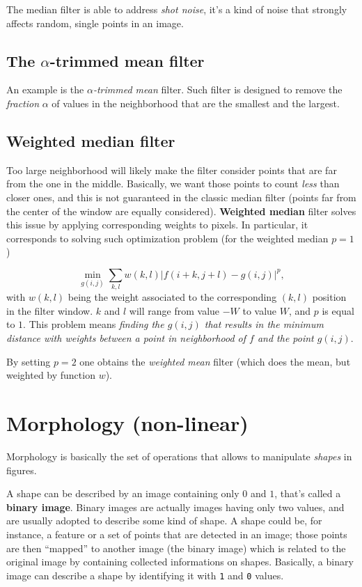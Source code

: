 \documentclass[10pt]{report}
\begin{document}
The median filter is able to address \emph{shot noise}, it's a kind of noise
that strongly affects random, single points in an image.

\subsection{The \(\alpha\)-trimmed mean filter}
\label{the-alpha-trimmed-mean-filter}
An example is the \emph{\(\alpha\)-trimmed mean} filter. Such filter is
designed to remove the \emph{fraction} \(\alpha\) of values in the
neighborhood that are the smallest and the largest.

\subsection{Weighted median filter}
\label{weighted-median-filter}
Too large neighborhood will likely make the filter consider points that
are far from the one in the middle. Basically, we want those points to
count \emph{less} than closer ones, and this is not guaranteed in the classic
median filter (points far from the center of the window are equally
considered). \textbf{Weighted median} filter solves this issue by applying
corresponding weights to pixels. In particular, it corresponds to
solving such optimization problem (for the weighted median \(p = 1\))

\[ \min_{g(i, j)} \sum_{k, l} w(k, l)|f(i + k, j + l) - g(i, j)|^p,\]
with \(w(k, l)\) being the weight associated to the corresponding
\((k, l)\) position in the filter window. \(k\) and \(l\) will range
from value \(-W\) to value \(W\), and \(p\) is equal to \(1\). This
problem means \emph{finding the \(g(i, j)\) that results in the minimum
distance with weights between a point in neighborhood of \(f\) and the
point \(g(i, j)\)}.

By setting \(p=2\) one obtains the \emph{weighted mean} filter (which does
the mean, but weighted by function \(w\)).

\section{Morphology (non-linear)}
\label{morphology-non-linear}
Morphology is basically the set of operations that allows to manipulate
\emph{shapes} in figures.

A shape can be described by an image containing only \(0\) and \(1\),
that's called a \textbf{binary image}. Binary images are actually images having
only two values, and are usually adopted to describe some kind of shape.
A shape could be, for instance, a feature or a set of points that are
detected in an image; those points are then ``mapped'' to another image
(the binary image) which is related to the original image by containing
collected informations on shapes. Basically, a binary image can describe
a shape by identifying it with \texttt{1} and \texttt{0} values.
\end{document}
